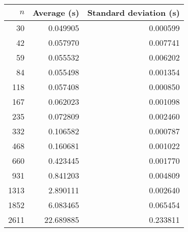 \begin{tabular}{rrr}
$n$ & Average (s) & Standard deviation (s)\\\hline
30 & 0.049905 & 0.000599\\
42 & 0.057970 & 0.007741\\
59 & 0.055532 & 0.006202\\
84 & 0.055498 & 0.001354\\
118 & 0.057408 & 0.000850\\
167 & 0.062023 & 0.001098\\
235 & 0.072809 & 0.002460\\
332 & 0.106582 & 0.000787\\
468 & 0.160681 & 0.001022\\
660 & 0.423445 & 0.001770\\
931 & 0.841203 & 0.004809\\
1313 & 2.890111 & 0.002640\\
1852 & 6.083465 & 0.065454\\
2611 & 22.689885 & 0.233811\\
\end{tabular}
